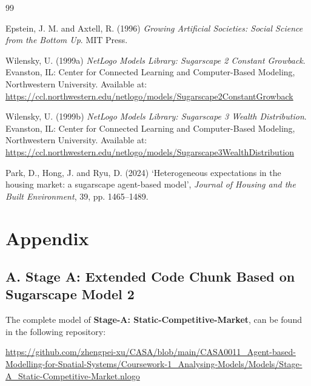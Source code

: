 \documentclass{article}
\begin{document}
\newpage
\begin{thebibliography}{99}

Epstein, J. M. and Axtell, R. (1996)
\textit{Growing Artificial Societies: Social Science from the Bottom Up}.
MIT Press.

Wilensky, U. (1999a)
\textit{NetLogo Models Library: Sugarscape 2 Constant Growback}.
Evanston, IL: Center for Connected Learning and Computer-Based Modeling,
Northwestern University.
Available at: \url{https://ccl.northwestern.edu/netlogo/models/Sugarscape2ConstantGrowback}

Wilensky, U. (1999b)
\textit{NetLogo Models Library: Sugarscape 3 Wealth Distribution}.
Evanston, IL: Center for Connected Learning and Computer-Based Modeling,
Northwestern University.
Available at: \url{https://ccl.northwestern.edu/netlogo/models/Sugarscape3WealthDistribution}

Park, D., Hong, J. and Ryu, D. (2024)
`Heterogeneous expectations in the housing market: a sugarscape agent-based model',
\textit{Journal of Housing and the Built Environment}, 39, pp. 1465--1489.

\end{thebibliography}




\newpage
\section*{Appendix}



\subsection*{A. Stage A: Extended Code Chunk Based on Sugarscape Model 2}
\noindent The complete model of \textbf{Stage-A: Static-Competitive-Market}, can be found in the following repository:

\vspace{0.5em}
\noindent \url{https://github.com/zhengpei-xu/CASA/blob/main/CASA0011_Agent-based-Modelling-for-Spatial-Systems/Coursework-1_Analysing-Models/Models/Stage-A_Static-Competitive-Market.nlogo}
\end{document}
